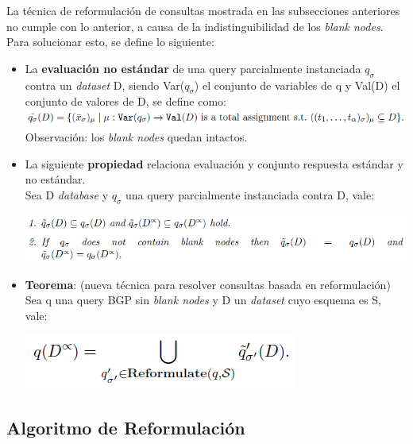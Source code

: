 \documentclass[10pt,a4paper]{article}
\begin{document}
La técnica de reformulación de consultas mostrada en las subsecciones anteriores no cumple con lo anterior, a causa de la indistinguibilidad de los \textit{blank nodes}.\\

Para solucionar esto, se define lo siguiente:

\begin{itemize}

\item La \textbf{evaluación no estándar} de una query parcialmente instanciada $q_{\sigma}$ contra un \textit{dataset} D, siendo Var($q_{\sigma}$) el conjunto de variables de q y Val(D) el conjunto de valores de D, se define como:\\
\includegraphics[scale=0.5]{imgs/03.png}\\
Observación: los \textit{blank nodes} quedan intactos.

\item La siguiente \textbf{propiedad} relaciona evaluación y conjunto respuesta estándar y no estándar.\\
Sea D \textit{database} y $q_{\sigma}$ una query parcialmente instanciada contra D, vale:

\includegraphics[scale=0.5]{imgs/04.png}

\item \textbf{Teorema}: (nueva técnica para resolver consultas basada en reformulación) Sea q una query BGP sin \textit{blank nodes} y D un \textit{dataset} cuyo esquema es S, vale:

\begin{center}
\includegraphics[scale=0.55]{imgs/05.png}
\end{center}

\end{itemize}

\subsection{Algoritmo de Reformulación}
\end{document}
